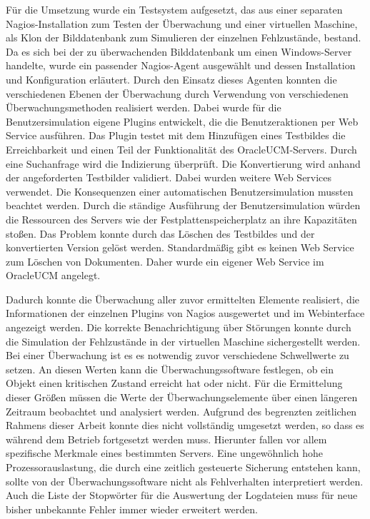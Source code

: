 Für die Umsetzung wurde ein Testsystem aufgesetzt, das aus einer separaten Nagios-Installation zum Testen der Überwachung und einer virtuellen Maschine, als Klon der Bilddatenbank zum Simulieren der einzelnen Fehlzustände, bestand.
Da es sich bei der zu überwachenden Bilddatenbank um einen Windows-Server handelte, wurde ein passender Nagios-Agent ausgewählt und dessen Installation und Konfiguration erläutert.
Durch den Einsatz dieses Agenten konnten die verschiedenen Ebenen der Überwachung durch Verwendung von verschiedenen Überwachungsmethoden realisiert werden.
Dabei wurde für die Benutzersimulation eigene Plugins entwickelt, die die Benutzeraktionen per Web Service ausführen.
Das Plugin testet mit dem Hinzufügen eines Testbildes die Erreichbarkeit und einen Teil der Funktionalität des \gls{OracleUCM}-Servers.
Durch eine Suchanfrage wird die Indizierung überprüft.
Die Konvertierung wird anhand der angeforderten Testbilder validiert.
Dabei wurden weitere Web Services verwendet.
Die Konsequenzen einer automatischen Benutzersimulation mussten beachtet werden.
Durch die ständige Ausführung der Benutzersimulation würden die Ressourcen des Servers wie der Festplattenspeicherplatz an ihre Kapazitäten stoßen.
Das Problem konnte durch das Löschen des Testbildes und der konvertierten Version gelöst werden.
Standardmäßig gibt es keinen Web Service zum Löschen von Dokumenten.
Daher wurde ein eigener Web Service im \gls{OracleUCM} angelegt.

Dadurch konnte die Überwachung aller zuvor ermittelten Elemente realisiert, die Informationen der einzelnen Plugins von Nagios ausgewertet und im Webinterface angezeigt werden.
Die korrekte Benachrichtigung über Störungen konnte durch die Simulation der Fehlzustände in der virtuellen Maschine sichergestellt werden.
\\

Bei einer Überwachung ist es es notwendig zuvor verschiedene Schwellwerte zu setzen.
An diesen Werten kann die Überwachungssoftware festlegen, ob ein Objekt einen kritischen Zustand erreicht hat oder nicht.
Für die Ermittelung dieser Größen müssen die Werte der Überwachungselemente über einen längeren Zeitraum beobachtet und analysiert werden.
Aufgrund des begrenzten zeitlichen Rahmens dieser Arbeit konnte dies nicht vollständig umgesetzt werden, so dass es während dem Betrieb fortgesetzt werden muss.
Hierunter fallen vor allem spezifische Merkmale eines bestimmten Servers.
Eine ungewöhnlich hohe Prozessorauslastung, die durch eine zeitlich gesteuerte Sicherung entstehen kann, sollte von der Überwachungssoftware nicht als Fehlverhalten interpretiert werden.
Auch die Liste der Stopwörter für die Auswertung der Logdateien muss für neue bisher unbekannte Fehler immer wieder erweitert werden.

